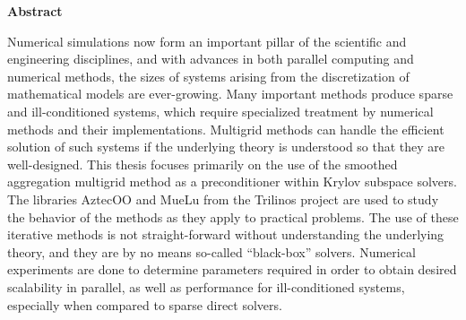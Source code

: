 \clearemptydoublepage
{}
{}

\vspace*{2cm}
\begin{center}
{\Large \textbf{Abstract}}
\end{center}
\vspace{1cm}

Numerical simulations now form an important pillar of the scientific and engineering disciplines, and with advances in both parallel computing and numerical methods, the sizes of systems arising from the discretization of mathematical models are ever-growing. Many important methods produce sparse and ill-conditioned systems, which require specialized treatment by numerical methods and their implementations. Multigrid methods can handle the efficient solution of such systems if the underlying theory is understood so that they are well-designed. This thesis focuses primarily on the use of the smoothed aggregation multigrid method as a preconditioner within Krylov subspace solvers. The libraries AztecOO and MueLu from the Trilinos project are used to study the behavior of the methods as they apply to practical problems. The use of these iterative methods is not straight-forward without understanding the underlying theory, and they are by no means so-called “black-box” solvers. Numerical experiments are done to determine parameters required in order to obtain desired scalability in parallel, as well as performance for ill-conditioned systems, especially when compared to sparse direct solvers.